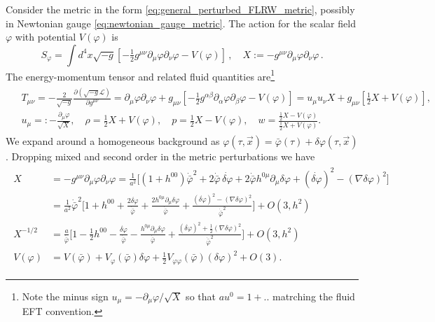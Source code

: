 Consider the metric in the form \eqref{eq:general_perturbed_FLRW_metric}, possibly in Newtonian gauge \eqref{eq:newtonian_gauge_metric}.
The action for the scalar field $\varphi$ with potential $V(\varphi)$ is
\begin{equation}
    S_\varphi = \int d^4x \sqrt{-g} \left[-\tfrac{1}{2} g^{\mu\nu}\partial_\mu\varphi \partial_\nu\varphi - V(\varphi)\right]\,, \quad X:= -g^{\mu\nu}\partial_\mu\varphi \partial_\nu\varphi\,.
\end{equation}
The energy-momentum tensor and related fluid quantities are\footnote{Note the minus sign $u_\mu = -\partial_\mu\varphi/\sqrt{X}$ so that $au^0=1+..$ matrching the fluid EFT convention.}
{\small
\begin{align}
\begin{aligned}
    &T_{\mu\nu}=-\tfrac{2}{\sqrt{-g}}\tfrac{\partial \left(\sqrt{-g}\mathcal{L}\right)}{\partial g^{\mu\nu}}
     = \partial_\mu\varphi \partial_\nu\varphi + g_{\mu\nu}\left[-\tfrac{1}{2}g^{\alpha\beta}\partial_\alpha\varphi \partial_\beta\varphi - V(\varphi)\right]
    = u_\mu u_\nu X + g_{\mu\nu}\left[\tfrac{1}{2}X + V(\varphi)\right],\\[3pt]
    &u_\mu =: -\frac{\partial_\mu\varphi}{\sqrt{X}}, \quad \rho= \tfrac12 X + V(\varphi), \quad p=\tfrac1{2}X - V(\varphi), \quad w=\frac{\tfrac1{2}X - V(\varphi)}{\tfrac1{2}X + V(\varphi)}.
\end{aligned}
\end{align}}
We expand around a homogeneous background as $\varphi(\tau,\vec{x})=\bar{\varphi}(\tau)+\delta\varphi(\tau,\vec{x})$.
Dropping mixed and second order in the metric perturbations we have 
\begin{align}\label{eq:expansion_X_V}
\begin{aligned}
    X&= -g^{\mu\nu}\partial_\mu\varphi \partial_\nu\varphi
    =\frac{1}{a^2}\bigg[(1+h^{00})\dot{\bar{\varphi}}^2 + 2\dot{\bar{\varphi}}\, \dot{\delta\varphi} + 2\dot{\bar{\varphi}}h^{0\mu}\partial_\mu\delta\varphi + (\dot{\delta\varphi})^2 - (\nabla\delta\varphi)^2\bigg]\\
    &= \frac{1}{a^2}\dot{\bar{\varphi}}^2\bigg[1+h^{00} + \frac{2\dot{\delta\varphi}}{\dot{\bar{\varphi}}} + \frac{2h^{0\mu}\partial_\mu\delta\varphi}{\dot{\bar{\varphi}}} + \frac{(\dot{\delta\varphi})^2 - (\nabla\delta\varphi)^2}{\dot{\bar{\varphi}}^2}\bigg]+O(3,h^2)\\[3pt]
    X^{-1/2}&= \frac{a}{\dot{\bar{\varphi}}}\bigg[1-\tfrac12 h^{00}-\frac{\dot{\delta\varphi}}{\dot{\bar{\varphi}}}-\frac{h^{0\mu}\partial_\mu\delta\varphi}{\dot{\bar{\varphi}}}+ \frac{(\dot{\delta\varphi})^2 +\tfrac12 (\nabla\delta\varphi)^2}{\dot{\bar{\varphi}}^2}\bigg]+O(3,h^2)\\
    V(\varphi)&= V(\bar{\varphi}) + V_\varphi(\bar{\varphi})\delta\varphi + \tfrac12 V_{\varphi\varphi}(\bar{\varphi})(\delta\varphi)^2+O(3).
\end{aligned}
\end{align}
